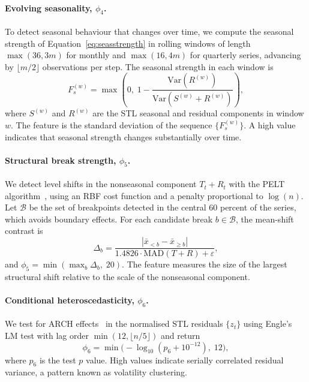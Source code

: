 \documentclass[pdflatex,sn-mathphys-num]{sn-jnl}
\theoremstyle{thmstyleone}
\theoremstyle{thmstyletwo}
\theoremstyle{thmstylethree}
\begin{document}
\paragraph{Evolving seasonality, $\phi_4$.}
To detect seasonal behaviour that changes over time, we compute the seasonal
strength of Equation~\ref{eq:seasstrength} in rolling windows of length
$\max(36, 3m)$ for monthly and $\max(16, 4m)$ for quarterly series, advancing
by $\lfloor m/2 \rfloor$ observations per step. The seasonal strength in each
window is
\begin{equation}
  F_s^{(w)} = \max\!\left(0,\; 1 - \frac{\mathrm{Var}(R^{(w)})}
                                         {\mathrm{Var}(S^{(w)} + R^{(w)})}\right),
  \label{eq:seasstrength}
\end{equation}
where $S^{(w)}$ and $R^{(w)}$ are the STL seasonal and residual components in
window $w$. The feature is the standard deviation of the sequence
$\{F_s^{(w)}\}$. A high value indicates that seasonal strength changes
substantially over time.

\paragraph{Structural break strength, $\phi_5$.}
We detect level shifts in the nonseasonal component $T_t + R_t$ with the PELT
algorithm~\cite{killick2012}, using an RBF cost function and a penalty
proportional to $\log(n)$. Let $\mathcal{B}$ be the set of breakpoints
detected in the central 60 percent of the series, which avoids boundary
effects. For each candidate break $b \in \mathcal{B}$, the mean-shift contrast
is
\begin{equation}
  \Delta_b = \frac{|\bar{x}_{<b} - \bar{x}_{\geq b}|}
                  {1.4826 \cdot \mathrm{MAD}(T + R) + \varepsilon},
  \label{eq:breakcontrast}
\end{equation}
and $\phi_5 = \min(\max_b \Delta_b,\; 20)$. The feature measures the size of
the largest structural shift relative to the scale of the nonseasonal
component.

\paragraph{Conditional heteroscedasticity, $\phi_6$.}
We test for ARCH effects~\cite{engle1982arch} in the normalised STL residuals
$\{z_t\}$ using Engle's LM test with lag order $\min(12, \lfloor n/5 \rfloor)$
and return
\begin{equation}
  \phi_6 = \min\!\bigl(-\log_{10}(p_6 + 10^{-12}),\; 12\bigr),
  \label{eq:phi6}
\end{equation}
where $p_6$ is the test $p$ value. High values indicate serially correlated
residual variance, a pattern known as volatility clustering.
\end{document}

